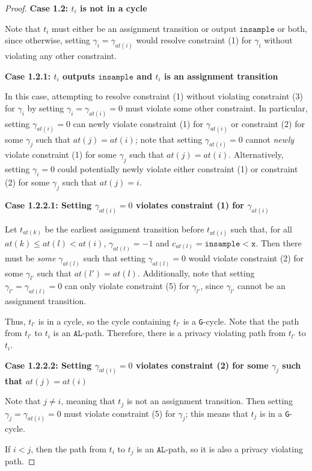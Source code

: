\documentclass[12pt]{article}
\newcommand{\lguard}[1][x]{\texttt{insample} < #1}
\newcommand{\gcycle}{\texttt{G}-cycle}
\theoremstyle{definition}
\begin{document}
\begin{proof}
    \textbf{Case 1.2: $t_i$ is not in a cycle}

    Note that $t_i$ must either be an assignment transition or output $\texttt{insample}$ or both, since otherwise, setting $\gamma_i = \gamma_{at(i)}$ would resolve constraint (1) for $\gamma_i$ without violating any other constraint. 

    \textbf{Case 1.2.1: $t_i$ outputs $\texttt{insample}$ and $t_i$ is an assignment transition}

    In this case, attempting to resolve constraint (1) without violating constraint (3) for $\gamma_i$ by setting $\gamma_i = \gamma_{at(i)} = 0$ must violate some other constraint. In particular, setting $\gamma_{at(i)} = 0$ can newly violate constraint (1) for $\gamma_{at(i)}$ or constraint (2) for some $\gamma_j$ such that $at(j) = at(i)$; note that setting $\gamma_{at(i)}=0$ cannot \textit{newly} violate constraint (1) for some $\gamma_j$ such that $at(j) = at(i)$. 
    Alternatively, setting $\gamma_i = 0$ could potentially newly violate either constraint (1) or constraint (2) for some $\gamma_j$ such that $at(j) = i$. 

    \textbf{Case 1.2.2.1: Setting $\gamma_{at(i)} =0$ violates constraint (1) for $\gamma_{at(i)}$}

    Let $t_{at(k)}$ be the earliest assignment transition before $t_{at(i)}$ such that, for all $at(k)\leq at(l)< at(i)$, $\gamma_{at(l)} = -1$ and $c_{at(l)} = \lguard[\texttt{x}]$. Then there must be \textit{some} $\gamma_{at(l)}$ such that setting $\gamma_{at(l)} = 0$ would violate constraint (2) for some $\gamma_{l'}$ such that $at(l') = at(l)$.  
    Additionally, note that setting $\gamma_{l'} = \gamma_{at(l)} = 0$ can only violate constraint (5) for $\gamma_{l'}$, since $\gamma_{l'}$ cannot be an assignment transition. 
    
    Thus, $t_{l'}$ is in a cycle, so the cycle containing $t_{l'}$ is a \gcycle. Note that the path from $t_{l'}$ to $t_i$ is an $\texttt{AL}$-path. Therefore, there is a privacy violating path from $t_{l'}$ to $t_i$.

    \textbf{Case 1.2.2.2: Setting $\gamma_{at(i)} =0$ violates constraint (2) for some $\gamma_j$ such that $at(j) = at(i)$}

    Note that $j\neq i$, meaning that $t_j$ is not an assignment transition. Then setting $\gamma_j = \gamma_{at(i)} = 0$ must violate constraint (5) for $\gamma_j$; this means that $t_j$ is in a \gcycle. 

    If $i<j$, then the path from $t_i$ to $t_j$ is an $\texttt{AL}$-path, so it is also a privacy violating path.


\end{proof}
\end{document}
